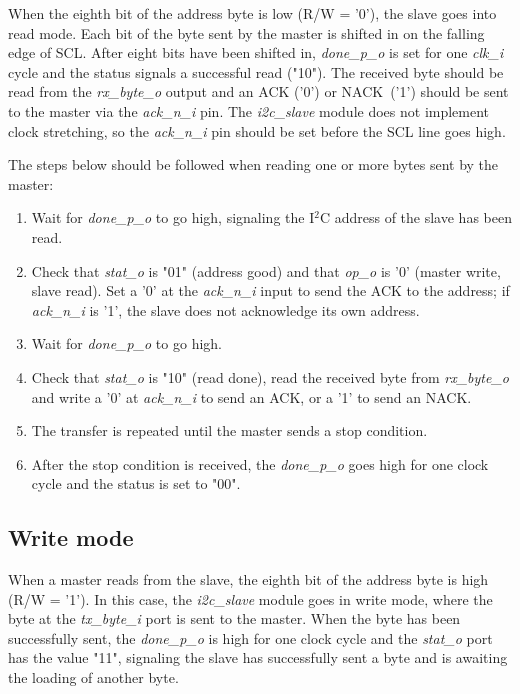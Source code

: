 \documentclass[a4paper,11pt]{article}
\begin{document}
When the eighth bit of the address byte is low (R/W = '0'), the slave goes into read
mode. Each bit of the byte sent by the master is shifted in on the falling edge of SCL. After 
eight bits have been shifted in, \textit{done\_p\_o} is set for one \textit{clk\_i} cycle and 
the status signals a successful read ("10"). The received byte should be read from the 
\textit{rx\_byte\_o} output and an ACK ('0') or NACK~('1') should be sent to the master via the
\textit{ack\_n\_i} pin. The \textit{i2c\_slave} module does not implement clock stretching, 
so the \textit{ack\_n\_i} pin should be set before the SCL line goes high.

The steps below should be followed when reading one or more bytes sent by the master:

\begin{enumerate}
  \item Wait for \textit{done\_p\_o} to go high, signaling the I$^2$C address of the slave
    has been read.
  \item Check that \textit{stat\_o} is "01" (address good) and that \textit{op\_o} is '0' 
    (master write, slave read). Set a '0' at the \textit{ack\_n\_i} input to send the 
    ACK to the address; if \textit{ack\_n\_i} is '1', the slave does not acknowledge its 
    own address.
  \item Wait for \textit{done\_p\_o} to go high.
  \item Check that \textit{stat\_o} is "10" (read done), read the received byte from
    \textit{rx\_byte\_o} and write a '0' at \textit{ack\_n\_i} to send an ACK, or a
    '1' to send an NACK.
  \item The transfer is repeated until the master sends a stop condition.
  \item After the stop condition is received, the \textit{done\_p\_o} goes high for one
  clock cycle and the status is set to "00".
\end{enumerate}

\subsection{Write mode}

When a master reads from the slave, the eighth bit of the address byte is high 
(R/W = '1'). In this case, the \textit{i2c\_slave} module goes in write mode, where
the byte at the \textit{tx\_byte\_i} port is sent to the master. When the byte has been
successfully sent, the \textit{done\_p\_o} is high for one clock cycle and the \textit{stat\_o}
port has the value "11", signaling the slave has successfully sent a byte and is
awaiting the loading of another byte.
\end{document}
